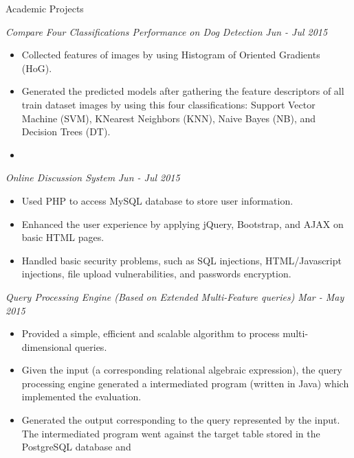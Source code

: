 \documentclass{resume} %
\begin{document}
\begin{rSection}{Academic Projects}

{\sl Compare Four Classifications Performance on Dog Detection} \hfill {\em Jun - Jul 2015} 
\begin{itemize}   %
 \setlength\itemsep{-0.5em}
 \renewcommand\labelitemi{--}
\item Collected features of images by using Histogram of Oriented Gradients (HoG).
\item Generated the predicted models after gathering the feature descriptors of all train dataset images by using this four classifications: Support Vector Machine (SVM), K­\-Nearest Neighbors (KNN), Naive Bayes (NB), and Decision Trees (DT). 
\item  
\end{itemize}
{\sl Online Discussion System} \hfill {\em Jun - Jul 2015} 
\begin{itemize}   %
 \setlength\itemsep{-0.5em}
 \renewcommand\labelitemi{--}
\item Used PHP to access MySQL database to store user information.
\item Enhanced the user experience by applying jQuery, Bootstrap, and AJAX on basic HTML pages. 
\item Handled basic security problems, such as SQL injections, HTML/Javascript injections, file upload vulnerabilities, and passwords encryption. 
\end{itemize}
{\sl Query Processing Engine (Based on Extended Multi-Feature queries)} \hfill {\em Mar - May 2015} 
\begin{itemize}   %
 \setlength\itemsep{-0.5em}
 \renewcommand\labelitemi{--}
\item Provided a simple, efficient and scalable algorithm to process multi-dimensional queries.
\item Given the input (a corresponding relational algebraic expression), the query processing engine generated a
intermediated program (written in Java) which implemented the evaluation. 
\item Generated the output corresponding to the query represented by the input.
 The intermediated program went against the target table stored in the PostgreSQL database and 

\end{itemize}
\end{rSection}
\end{document}
